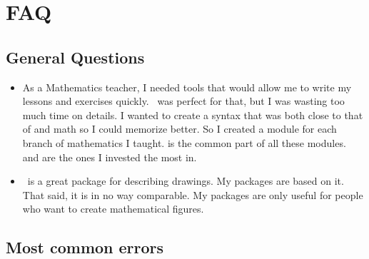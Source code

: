 \section{FAQ}

\subsection{General Questions}

\begin{itemize}\setlength{\itemsep}{10pt}

\item {}

As a Mathematics teacher, I needed tools that would allow me to write my lessons
and exercises quickly. \TIKZ\ was perfect for that, but I was wasting too much
time on details. I wanted to create a syntax that was both close to that of \LATEX{}
and math so I could memorize better. So I created a module for each branch of mathematics I taught.
 is the common part of all these modules.
 and  are the ones I invested
the most in.

\item {}

\TIKZ\ is a great package for describing drawings. My packages are based on it.
That said, it is in no way comparable. My packages are only useful for people who want to create
mathematical figures.
\end{itemize}

\subsection{Most common errors}

